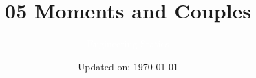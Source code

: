 \documentclass[9pt, xcolor={svgnames, x11names},professionalfonts]{beamer}
\title[Moments \& Couples]{\Huge 05 Moments and Couples}
\subtitle[Engineering Statics]{\Large\textcolor{white}{Engineering Statics}}
\author{}
\date{\small Updated on: \today}
\def\scale{1}
\begin{document}

\begin{frame}[plain]    %
	\titlepage
\end{frame}




\end{document}
